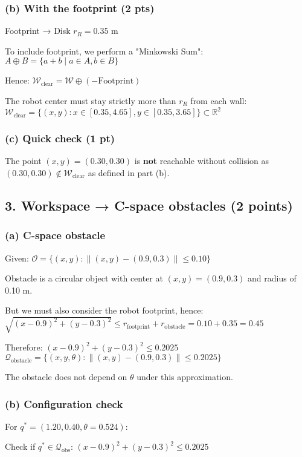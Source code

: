 \documentclass[11pt]{article}
\begin{document}
\subsubsection*{(b) With the footprint (2 pts)}
Footprint → Disk $r_R = 0.35$ m

To include footprint, we perform a "Minkowski Sum":
$A \oplus B = \{a + b \mid a \in A, b \in B\}$

Hence:
$\mathcal{W}_{\text{clear}} = \mathcal{W} \oplus (-\text{Footprint})$

The robot center must stay strictly more than $r_R$ from each wall:
$\mathcal{W}_{\text{clear}} = \{(x, y) : x \in [0.35, 4.65], y \in [0.35, 3.65]\} \subset \mathbb{R}^2$

\subsubsection*{(c) Quick check (1 pt)}
The point $(x, y) = (0.30, 0.30)$ is \textbf{not} reachable without collision as $(0.30, 0.30) \notin \mathcal{W}_{\text{clear}}$ as defined in part (b).

\subsection*{3. Workspace → C-space obstacles (2 points)}
\subsubsection*{(a) C-space obstacle}
Given: $\mathcal{O} = \{(x, y) : \|(x, y) - (0.9, 0.3)\| \leq 0.10\}$

Obstacle is a circular object with center at $(x, y) = (0.9, 0.3)$ and radius of 0.10 m.

But we must also consider the robot footprint, hence:
$\sqrt{(x - 0.9)^2 + (y - 0.3)^2} \leq r_{\text{footprint}} + r_{\text{obstacle}} = 0.10 + 0.35 = 0.45$

Therefore:
$(x - 0.9)^2 + (y - 0.3)^2 \leq 0.2025$
$\mathcal{Q}_{\text{obstacle}} = \{(x, y, \theta) : \|(x, y) - (0.9, 0.3)\| \leq 0.2025\}$

The obstacle does not depend on $\theta$ under this approximation.

\subsubsection*{(b) Configuration check}
For $q^* = (1.20, 0.40, \theta = 0.524)$:

Check if $q^* \in \mathcal{Q}_{\text{obs}}$:
$(x - 0.9)^2 + (y - 0.3)^2 \leq 0.2025$
\end{document}
